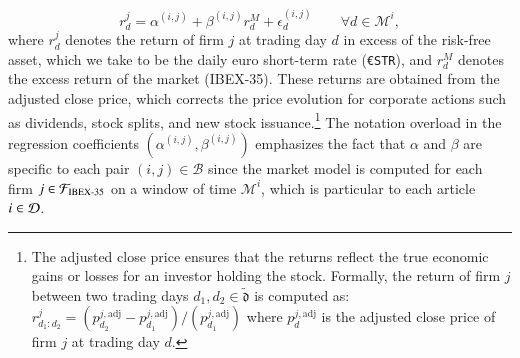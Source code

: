 %
$$
r_{d}^{j} = \alpha^{(i,j)} + \beta^{(i,j)} r_{d}^M + \epsilon_{ d}^{(i,j)} 
\qquad  
\forall d \in \mathcal{M}^i
,
$$
where 
$r_{d}^{j}$ denotes the return of firm $j$ at trading day $d$ in excess of the risk-free asset, which we take to be the daily euro short-term rate (\texttt{\euro STR}),
and 
$r_{d}^M$ denotes the excess return of the market (IBEX-35).  
These returns are obtained from the adjusted close price, which corrects the price evolution for corporate actions such as dividends, stock splits, and new stock issuance.\footnote{
The adjusted close price ensures that the returns reflect the true economic gains or losses for an investor holding the stock. 
%
Formally, the return of firm $j$ between two trading days $d_1, d_2\in \tilde{\mathfrak{d}}$ is computed as:
$
r_{d_1:d_2}^{j} = 
(
p_{d_2}^{j,\text{adj}} - p_{d_1}^{j,\text{adj}}
)/(
p_{d_1}^{j,\text{adj}}
)
$
where $p_{d}^{j,\text{adj}}$ is the adjusted close price of firm $j$ at trading day $d$.
}
%
The notation overload in the regression coefficients $(\alpha^{(i,j)},\beta^{(i,j)})$ emphasizes the fact that $\alpha$ and $\beta$ are specific to each pair $(i,j)\in\mathcal B$ since the market model is computed for each firm $j\in\mathcal{F}_{\text{IBEX-35}}$ on a window of time $\mathcal{M}^i$, which is particular to each article $i\in\mathcal{D}$.

